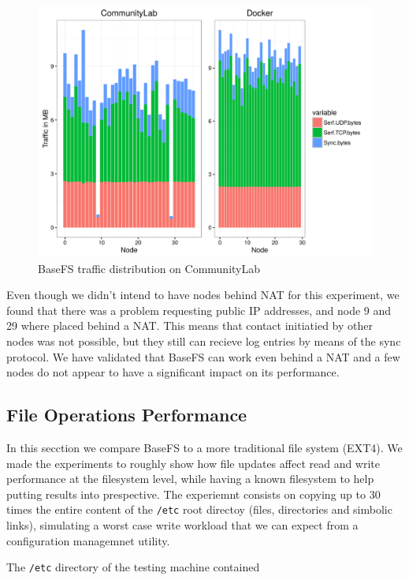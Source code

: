 \documentclass{sig-alternate}
\begin{document}
\begin{figure}[htp]
\centering
\includegraphics[width=\columnwidth]{../eval/plots/basefs-traffic-distribution.png}
\caption{BaseFS traffic distribution on CommunityLab}
\label{fig:basefs-traffic-distribution}
\end{figure}

Even though we didn't intend to have nodes behind NAT for this experiment, we found that there was a problem requesting public IP addresses, and node 9 and 29 where placed behind a NAT. This means that contact initiatied by other nodes was not possible, but they still can recieve log entries by means of the sync protocol. We have validated that BaseFS can work even behind a NAT and a few nodes do not appear to have a significant impact on its performance.


\subsection{File Operations Performance}
    
In this secction we compare BaseFS to a more traditional file system (EXT4). We made the experiments to roughly show how file updates affect read and write performance at the filesystem level, while having a known filesystem to help putting results into prespective. The experiemnt consists on copying up to 30 times the entire content of the \texttt{/etc} root directoy (files, directories and simbolic links), simulating a worst case write workload that we can expect from a configuration managemnet utility.

The \texttt{/etc} directory of the testing machine contained
\end{document}
